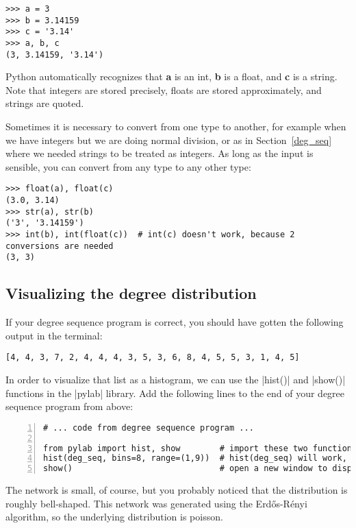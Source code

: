 \documentclass{article}
\begin{document}
\begin{Verbatim}[samepage=true]
>>> a = 3
>>> b = 3.14159
>>> c = '3.14'
>>> a, b, c
(3, 3.14159, '3.14')
\end{Verbatim}

Python automatically recognizes that \textbf{a} is an int, \textbf{b} is a float, and \textbf{c} is a string.  Note that integers are stored precisely,
floats are stored approximately, and strings are quoted.

Sometimes it is necessary to convert from one type to another, for example when we have integers but we are doing normal division, or as in Section~\ref{deg_seq}
where we needed strings to be treated as integers.  As long as the input is sensible, you can convert from any type to any other type:

\begin{Verbatim}[samepage=true]
>>> float(a), float(c)
(3.0, 3.14)
>>> str(a), str(b)
('3', '3.14159')
>>> int(b), int(float(c))  # int(c) doesn't work, because 2 conversions are needed
(3, 3)
\end{Verbatim}

\subsection{Visualizing the degree distribution}
If your degree sequence program is correct, you should have gotten the following output in the terminal:

\begin{Verbatim}
[4, 4, 3, 7, 2, 4, 4, 4, 3, 5, 3, 6, 8, 4, 5, 5, 3, 1, 4, 5]
\end{Verbatim}

In order to visualize that list as a histogram, we can use the |hist()| and |show()| functions in the |pylab| library.  Add the following lines to 
the end of your degree sequence program from above:

\begin{Verbatim}[numbers=left, samepage=true]
# ... code from degree sequence program ...

from pylab import hist, show        # import these two functions from the pylab library
hist(deg_seq, bins=8, range=(1,9))  # hist(deg_seq) will work, but not look very good
show()                              # open a new window to display the plot
\end{Verbatim}

The network is small, of course, but you probably noticed that the distribution is roughly bell-shaped.  This network was generated using the
Erd\H{o}s-R\'{e}nyi algorithm, so the underlying distribution is poisson.
\end{document}
